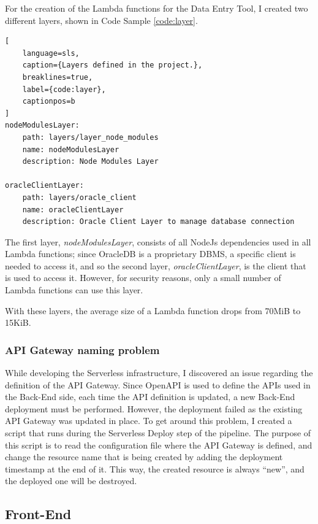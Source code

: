 For the creation of the Lambda functions for the Data Entry Tool, I created two different layers, shown in Code Sample \ref{code:layer}.


\begin{lstlisting}[
    language=sls,
    caption={Layers defined in the project.},
    breaklines=true,
    label={code:layer},
    captionpos=b
]
nodeModulesLayer: 
    path: layers/layer_node_modules
    name: nodeModulesLayer
    description: Node Modules Layer

oracleClientLayer: 
    path: layers/oracle_client
    name: oracleClientLayer
    description: Oracle Client Layer to manage database connection
\end{lstlisting}

The first layer, \emph{nodeModulesLayer}, consists of all NodeJs dependencies used in all Lambda functions; since OracleDB is a proprietary DBMS, a specific client is needed to access it, and so the second layer, \emph{oracleClientLayer}, is the client that is used to access it. However, for security reasons, only a small number of Lambda functions can use this layer.

With these layers, the average size of a Lambda function drops from 70MiB to 15KiB.


\subsubsection{API Gateway naming problem}
While developing the Serverless infrastructure, I discovered an issue regarding the definition of the API Gateway. Since OpenAPI is used to define the APIs used in the Back-End side, each time the API definition is updated, a new Back-End deployment must be performed. However, the deployment failed as the existing API Gateway was updated in place. To get around this problem, I created a script that runs during the Serverless Deploy step of the pipeline. The purpose of this script is to read the configuration file where the API Gateway is defined, and change the resource name that is being created by adding the deployment timestamp at the end of it. This way, the created resource is always ``new'', and the deployed one will be destroyed.


\subsection{Front-End}
